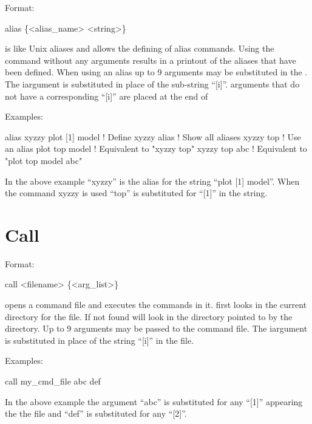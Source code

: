 Format: 
\begin{example}
  alias \{<alias_name> <string>\}
\end{example}

\vskip 0.2in

 is like Unix aliases and allows the defining of alias
commands. Using the  command without any arguments results
in a printout of the aliases that have been defined. When using an
alias up to 9 arguments may be substituted in the . The
i\Th argument is substituted in place of the sub-string ``[i]''.
arguments that do not have a corresponding ``[i]'' are placed at the end
of 

Examples:
\begin{example}
    alias xyzzy plot [1] model  ! Define xyzzy
    alias                       ! Show all aliases
    xyzzy top                   ! Use an alias
    plot top model              ! Equivalent to "xyzzy top"
    xyzzy top abc               ! Equivalent to "plot top model abc"
\end{example}
In the above example ``xyzzy'' is the alias for the string ``plot [1]
model''.  When the command xyzzy is used ``top'' is substituted
for ``[1]'' in the string.

\section{Call}
\label{s:call}

Format: 
\begin{example}
  call <filename> \{<arg_list>\}  \Strut
\end{example}

\vskip 0.2in
 opens a command file and executes the commands in it.  \tao
first looks in the current directory for the file. If not found \tao
will look in the directory pointed to by the 
directory.  Up to 9 arguments may be passed to the command file. The
i\Th argument is substituted in place of the string ``[i]'' in the
file. 

Examples:
\begin{example}
    call my_cmd_file abc def 
\end{example}
In the above example the argument ``abc'' is substituted for any
``[1]'' appearing the the file and ``def'' is substituted for any
``[2]''.

